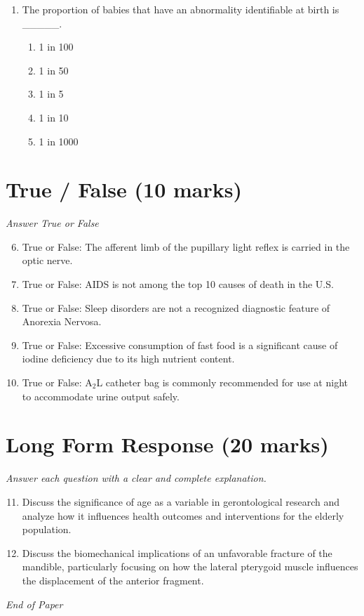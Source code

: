 \documentclass[12pt]{article}
\begin{document}
\begin{enumerate}[label=\arabic*.]
\begin{enumerate}[label=(\alph*)]
    \item Increase memory and intelligence
    \item Produce emotional stability
    \item Reduce allergic reactions
\end{enumerate}
\item The proportion of babies that have an abnormality identifiable at birth is \_\_\_\_\_.
\begin{enumerate}[label=(\alph*)]
    \item 1 in 100
    \item 1 in 50
    \item 1 in 5
    \item 1 in 10
    \item 1 in 1000
\end{enumerate}
\end{enumerate}

\section*{True / False (10 marks)}
\textit{Answer True or False}
\begin{enumerate}[label=\arabic*.]
\setcounter{enumi}{5}
\item True or False: The afferent limb of the pupillary light reflex is carried in the optic nerve.
\item True or False: AIDS is not among the top 10 causes of death in the U.S.
\item True or False: Sleep disorders are not a recognized diagnostic feature of Anorexia Nervosa.
\item True or False: Excessive consumption of fast food is a significant cause of iodine deficiency due to its high nutrient content.
\item True or False: A$_{2}$L catheter bag is commonly recommended for use at night to accommodate urine output safely.
\end{enumerate}

\section*{Long Form Response (20 marks)}
\textit{Answer each question with a clear and complete explanation.}
\begin{enumerate}[label=\arabic*.]
\setcounter{enumi}{10}
\item Discuss the significance of age as a variable in gerontological research and analyze how it influences health outcomes and interventions for the elderly population.
\item Discuss the biomechanical implications of an unfavorable fracture of the mandible, particularly focusing on how the lateral pterygoid muscle influences the displacement of the anterior fragment.
\end{enumerate}

\vfill
\noindent\textit{End of Paper}
\end{document}
